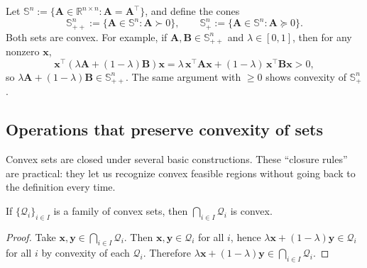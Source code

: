 \begin{example}
Let $\mathbb{S}^n:=\{\mathbf{A}\in\mathbb{R}^{n\times n}:\mathbf{A}=\mathbf{A}^\top\}$,
and define the cones
\[
  \mathbb{S}^n_{++}:=\{\mathbf{A}\in\mathbb{S}^n:\mathbf{A}\succ 0\},
  \qquad
  \mathbb{S}^n_{+}:=\{\mathbf{A}\in\mathbb{S}^n:\mathbf{A}\succeq 0\}.
\]
Both sets are convex. For example, if $\mathbf{A},\mathbf{B}\in\mathbb{S}^n_{++}$ and $\lambda\in[0,1]$, then for any
nonzero $\mathbf{x}$,
\[
  \mathbf{x}^\top(\lambda\mathbf{A}+(1-\lambda)\mathbf{B})\mathbf{x}
  =\lambda\,\mathbf{x}^\top\mathbf{A}\mathbf{x}+(1-\lambda)\,\mathbf{x}^\top\mathbf{B}\mathbf{x}>0,
\]
so $\lambda\mathbf{A}+(1-\lambda)\mathbf{B}\in\mathbb{S}^n_{++}$. The same argument with $\ge 0$ shows convexity of
$\mathbb{S}^n_{+}$.
\end{example}

\subsection{Operations that preserve convexity of sets}
\label{sec:ch4-set-operations}
Convex sets are closed under several basic constructions. These ``closure rules'' are practical:
they let us recognize convex feasible regions without going back to the definition every time.

\begin{claim}[Intersection]
If $\{\mathcal{Q}_i\}_{i\in I}$ is a family of convex sets, then $\bigcap_{i\in I}\mathcal{Q}_i$ is convex.
\end{claim}
\begin{proof}
Take $\mathbf{x},\mathbf{y}\in\bigcap_{i\in I}\mathcal{Q}_i$. Then $\mathbf{x},\mathbf{y}\in\mathcal{Q}_i$ for all
$i$, hence $\lambda\mathbf{x}+(1-\lambda)\mathbf{y}\in\mathcal{Q}_i$ for all $i$ by convexity of each $\mathcal{Q}_i$.
Therefore $\lambda\mathbf{x}+(1-\lambda)\mathbf{y}\in\bigcap_{i\in I}\mathcal{Q}_i$.
\end{proof}

